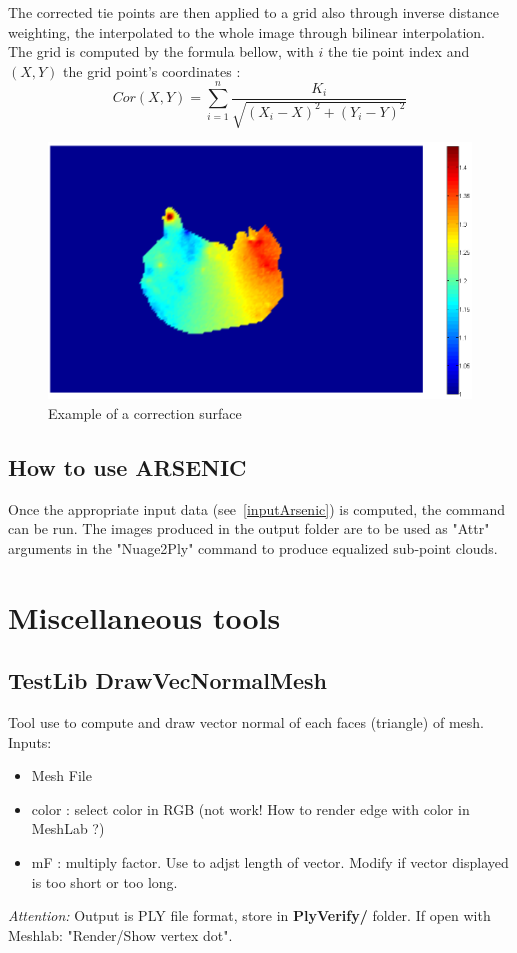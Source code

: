 The corrected tie points are then applied to a grid also through inverse distance weighting, the interpolated to the whole image through bilinear interpolation. The grid is computed by the formula bellow, with $i$ the tie point index and $(X,Y)$ the grid point's coordinates : \[Cor(X,Y)=\sum_{i=1}^{n} \frac{K_{i}}{\sqrt{(X_{i}-X)^2+(Y_{i}-Y)^2}}\]

\begin{figure}[H]
\centering
\includegraphics[width=15cm]{FIGS/Arsenic/SurfCorr.png}
\caption{Example of a correction surface}
\label{SurfCorr}
\end{figure}


\subsection{How to use ARSENIC}

Once the appropriate input data (see~\ref{inputArsenic}) is computed, the command can be run. The images produced in the output folder are to be used as "Attr" arguments in the "Nuage2Ply" command to produce equalized sub-point clouds.

\section{Miscellaneous tools}

\subsection{TestLib DrawVecNormalMesh}
Tool use to compute and draw vector normal of each faces (triangle) of mesh.
Inputs:
\begin{itemize}
\item Mesh File
\item color : select color in RGB (not work! How to render edge with color in MeshLab ?)
\item mF : multiply factor. Use to adjst length of vector. Modify if vector displayed is too short or too long.
\end{itemize}
\textit{Attention:} Output is PLY file format, store in \textbf{PlyVerify/} folder. If open with Meshlab: "Render/Show vertex dot".

